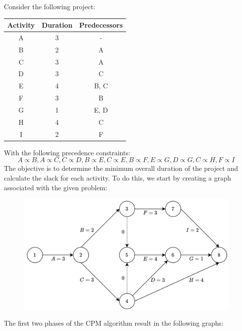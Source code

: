\begin{example}
    Consider the following project:
    \begin{table}[H]
        \centering
        \begin{tabular}{ccc}
        \hline
        \textbf{Activity} & \textbf{Duration} & \textbf{Predecessors} \\ \hline
        A                 & 3                 & -                     \\
        B                 & 2                 & A                     \\
        C                 & 3                 & A                     \\
        D                 & 3                 & C                     \\
        E                 & 4                 & B, C                  \\
        F                 & 3                 & B                     \\
        G                 & 1                 & E, D                  \\
        H                 & 4                 & C                     \\
        I                 & 2                 & F                     \\ \hline
        \end{tabular}
    \end{table}
    With the following precedence constraints:
    \[A \varpropto B,A \varpropto C,C \varpropto D,B \varpropto E, C \varpropto E,B \varpropto F,E \varpropto G,D \varpropto G,C \varpropto H,F \varpropto I\]
    The objective is to determine the minimum overall duration of the project and calculate the slack for each activity. 
    To do this, we start by creating a graph associated with the given problem:
    \begin{figure}[H]
        \centering
        \includegraphics[width=0.6\linewidth]{images/eproject.png}
    \end{figure}
    The first two phases of the CPM algorithm result in the following graphs:

\end{example}
